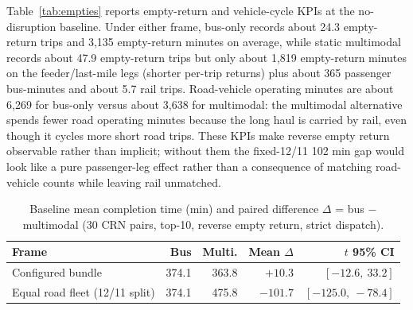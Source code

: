 \documentclass{ieeeaccess}
\begin{document}
Table~\ref{tab:empties} reports empty-return and vehicle-cycle KPIs at the no-disruption baseline. Under either frame, bus-only records about 24.3 empty-return trips and 3{,}135 empty-return minutes on average, while static multimodal records about 47.9 empty-return trips but only about 1{,}819 empty-return minutes on the feeder/last-mile legs (shorter per-trip returns) plus about 365 passenger bus-minutes and about 5.7 rail trips. Road-vehicle operating minutes are about 6{,}269 for bus-only versus about 3{,}638 for multimodal: the multimodal alternative spends fewer road operating minutes because the long haul is carried by rail, even though it cycles more short road trips. These KPIs make reverse empty return observable rather than implicit; without them the fixed-12/11 102 min gap would look like a pure passenger-leg effect rather than a consequence of matching road-vehicle counts while leaving rail unmatched.

\begin{table}[!t]
\caption{Baseline mean completion time (min) and paired difference $\Delta$ = bus $-$ multimodal (30 CRN pairs, top-10, reverse empty return, strict dispatch).}
\label{tab:baseline}
\centering
\footnotesize
\begin{tabular}{@{}lrrrr@{}}
\hline
Frame & Bus & Multi. & Mean $\Delta$ & $t$ 95\% CI \\
\hline
Configured bundle & 374.1 & 363.8 & $+10.3$ & $[-12.6,\ 33.2]$ \\
Equal road fleet (12/11 split) & 374.1 & 475.8 & $-101.7$ & $[-125.0,\ -78.4]$ \\
\hline
\end{tabular}
\end{table}
\end{document}
